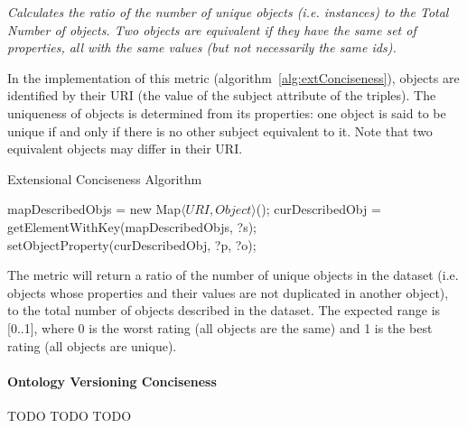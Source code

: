 \begin{mdframed}[style=metricdefinition]
\emph{Calculates the ratio of the number of unique objects (i.e. instances) to the Total Number of objects. Two objects are equivalent if they have the same set of properties, all with the same values (but not necessarily the same ids).}
\end{mdframed}

In the implementation of this metric (algorithm~\ref{alg:extConciseness}), objects are identified by their URI (the value of the subject attribute of the triples). The uniqueness of objects is determined from its properties: one object is said to be unique if and only if there is no other subject equivalent to it. Note that two equivalent objects may differ in their URI.
\begin{algorithm}
\caption{Extensional Conciseness Algorithm} \label{alg:extConciseness}
\begin{algorithmic}[1]
\State mapDescribedObjs = new Map$\langle URI, Object\rangle$();
\EndProcedure
{}
\State curDescribedObj = getElementWithKey(mapDescribedObjs, ?s);
\State setObjectProperty(curDescribedObj, ?p, ?o); ~\\
\EndProcedure
\end{algorithmic}
\end{algorithm}
The metric will return a ratio of the number of unique objects in the dataset (i.e. objects whose properties and their values are not duplicated in another object), to the total number of objects described in the dataset. The expected range is [0..1], where 0 is the worst rating (all objects are the same) and 1 is the best rating (all objects are unique).

\paragraph{Ontology Versioning Conciseness}
TODO TODO TODO